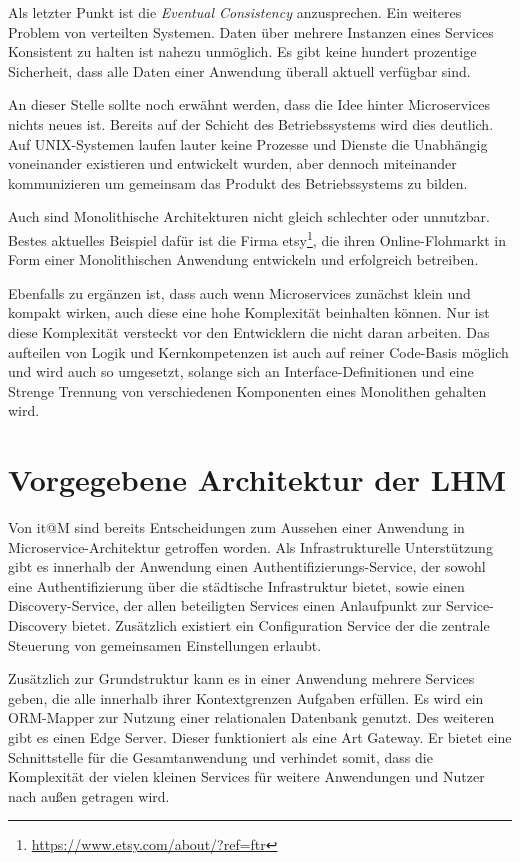 \documentclass[12pt,a4paper,bibliography=totocnumbered,listof=totocnumbered]{scrartcl}
\begin{document}
Als letzter Punkt ist die \textit{Eventual Consistency} anzusprechen. Ein weiteres Problem von verteilten Systemen. Daten über mehrere Instanzen eines Services Konsistent zu halten ist nahezu unmöglich. Es gibt keine hundert prozentige Sicherheit, dass alle Daten einer Anwendung überall aktuell verfügbar sind.

An dieser Stelle sollte noch erwähnt werden, dass die Idee hinter Microservices nichts neues ist. Bereits auf der Schicht des Betriebssystems wird dies deutlich. Auf UNIX-Systemen laufen lauter keine Prozesse und Dienste die Unabhängig voneinander existieren und entwickelt wurden, aber dennoch miteinander kommunizieren um gemeinsam das Produkt des Betriebssystems zu bilden.\cite{hoff}

Auch sind Monolithische Architekturen nicht gleich schlechter oder unnutzbar. Bestes aktuelles Beispiel dafür ist die Firma etsy\footnote{\url{https://www.etsy.com/about/?ref=ftr}}, die ihren Online-Flohmarkt in Form einer Monolithischen Anwendung entwickeln und erfolgreich betreiben.

Ebenfalls zu ergänzen ist, dass auch wenn Microservices zunächst klein und kompakt wirken, auch diese eine hohe Komplexität beinhalten können. Nur ist diese Komplexität versteckt vor den Entwicklern die nicht daran arbeiten. Das aufteilen von Logik und Kernkompetenzen ist auch auf reiner Code-Basis möglich und wird auch so umgesetzt, solange sich an Interface-Definitionen und eine Strenge Trennung von verschiedenen Komponenten eines Monolithen gehalten wird.\cite{hoff}

\section{Vorgegebene Architektur der \acf{LHM}}\label{ch:arch-itm}

Von it@M sind bereits Entscheidungen zum Aussehen einer Anwendung in Microservice-Architektur getroffen worden. Als Infrastrukturelle Unterstützung gibt es innerhalb der Anwendung einen Authentifizierungs-Service, der sowohl eine Authentifizierung über die städtische Infrastruktur bietet, sowie einen Discovery-Service, der allen beteiligten Services einen Anlaufpunkt zur Service-Discovery bietet. Zusätzlich existiert ein Configuration Service der die zentrale Steuerung von gemeinsamen Einstellungen erlaubt.

Zusätzlich zur Grundstruktur kann es in einer Anwendung mehrere Services geben, die alle innerhalb ihrer Kontextgrenzen Aufgaben erfüllen. Es wird ein ORM-Mapper zur Nutzung einer relationalen Datenbank genutzt. Des weiteren gibt es einen Edge Server. Dieser funktioniert als eine Art Gateway. Er bietet eine Schnittstelle für die Gesamtanwendung und verhindet somit, dass die Komplexität der vielen kleinen Services für weitere Anwendungen und Nutzer nach außen getragen wird.
\end{document}
